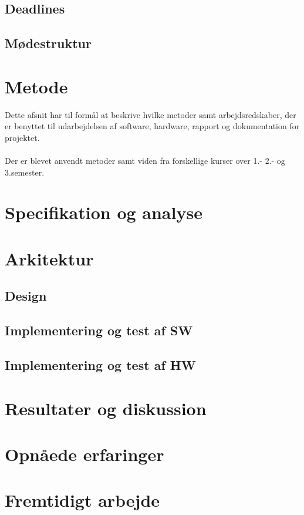 \subsection{Deadlines}

\subsection{Mødestruktur}

 




\section{Metode}
Dette afsnit har til formål at beskrive hvilke metoder samt arbejdsredskaber, der er benyttet til udarbejdelsen af software, hardware, rapport og dokumentation for projektet. 
\\\\
Der er blevet anvendt metoder samt viden fra forskellige kurser over 1.- 2.- og 3.semester. 





\section{Specifikation og analyse}

\section{Arkitektur}
\subsection{Design}
\subsection{Implementering og test af SW}
\subsection{Implementering og test af HW}

\section{Resultater og diskussion}

\section{Opnåede erfaringer}

\section{Fremtidigt arbejde}


